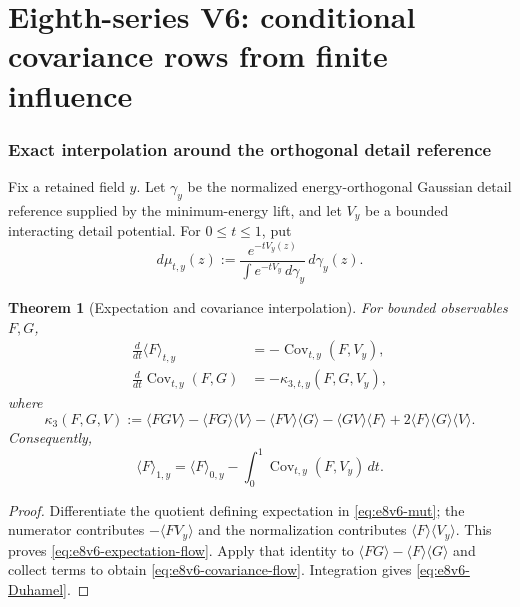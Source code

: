 \documentclass[11pt,oneside]{book}
\newtheorem{theorem}{Theorem}[chapter]
\theoremstyle{definition}
\theoremstyle{remark}
\begin{document}


\part{Eighth-series V6: conditional covariance rows from finite
influence}
\label{part:e8v6}

\section{Exact interpolation around the orthogonal detail reference}
\label{sec:e8v6-interpolation}

Fix a retained field \(y\).  Let \(\gamma_y\) be the normalized
energy-orthogonal Gaussian detail reference supplied by the
minimum-energy lift, and let \(V_y\) be a bounded interacting detail
potential.  For \(0\le t\le1\), put
\[
 d\mu_{t,y}(z):=
 \frac{e^{-tV_y(z)}}{\int e^{-tV_y}\,d\gamma_y}\,
 d\gamma_y(z).                                      \label{eq:e8v6-mut}
\]

\begin{theorem}[Expectation and covariance interpolation]
\label{thm:e8v6-interpolation}
For bounded observables \(F,G\),
\begin{align}
 \frac d{dt}\langle F\rangle_{t,y}
 &=-\operatorname{Cov}_{t,y}(F,V_y),                 \label{eq:e8v6-expectation-flow}\\
 \frac d{dt}\operatorname{Cov}_{t,y}(F,G)
 &=-\kappa_{3,t,y}(F,G,V_y),                         \label{eq:e8v6-covariance-flow}
\end{align}
where
\[
 \kappa_3(F,G,V)
 :=\langle FGV\rangle-\langle FG\rangle\langle V\rangle
 -\langle FV\rangle\langle G\rangle
 -\langle GV\rangle\langle F\rangle
 +2\langle F\rangle\langle G\rangle\langle V\rangle. \label{eq:e8v6-kappa3}
\]
Consequently,
\[
 \langle F\rangle_{1,y}
 =\langle F\rangle_{0,y}
  -\int_0^1\operatorname{Cov}_{t,y}(F,V_y)\,dt.       \label{eq:e8v6-Duhamel}
\]
\end{theorem}

\begin{proof}
Differentiate the quotient defining expectation in
\eqref{eq:e8v6-mut}; the numerator contributes
\(-\langle FV_y\rangle\) and the normalization contributes
\(\langle F\rangle\langle V_y\rangle\).  This proves
\eqref{eq:e8v6-expectation-flow}.  Apply that identity to
\(\langle FG\rangle-\langle F\rangle\langle G\rangle\) and collect
terms to obtain \eqref{eq:e8v6-covariance-flow}.  Integration gives
\eqref{eq:e8v6-Duhamel}.
\end{proof}
\end{document}
